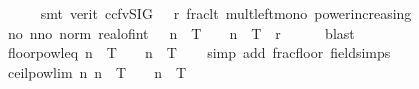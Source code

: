 \begin{isabellebody}
\ \ \ \ \isamarkupfalse%
\ {\isacharparenleft}{\kern0pt}smt\ {\isacharparenleft}{\kern0pt}verit{\isacharcomma}{\kern0pt}\ ccfv{\isacharunderscore}{\kern0pt}SIG{\isacharparenright}{\kern0pt}\ {\isacartoucheopen}{}\ {\isacharless}{\kern0pt}\ r{\isacartoucheclose}\ frac{\isacharunderscore}{\kern0pt}lt{\isacharunderscore}{\kern0pt}{}\ mult{\isacharunderscore}{\kern0pt}left{\isacharunderscore}{\kern0pt}mono\ power{\isacharunderscore}{\kern0pt}increasing{\isacharparenright}{\kern0pt}\isanewline
\ \ \isamarkupfalse%
\ \isamarkupfalse%
\ {\isachardoublequoteopen}{\isasymexists}no{\isachardot}{\kern0pt}\ {\isasymforall}n{\isasymge}no{\isachardot}{\kern0pt}\ norm\ {\isacharparenleft}{\kern0pt}real{\isacharunderscore}{\kern0pt}of{\isacharunderscore}{\kern0pt}int\ {\isasymlfloor}{}\ {\isacharcircum}{\kern0pt}\ n\ {\isacharasterisk}{\kern0pt}\ T{\isasymrfloor}\ {\isacharslash}{\kern0pt}\ {}\ {\isacharcircum}{\kern0pt}\ n\ {\isacharminus}{\kern0pt}\ T{\isacharparenright}{\kern0pt}\ {\isacharless}{\kern0pt}\ r{\isachardoublequoteclose}\isanewline
\ \ \ \ \isamarkupfalse%
\ blast\isanewline
{}\isamarkupfalse%
%
\endisatagproof
{\isafoldproof}%
%
\isadelimproof
%
\endisadelimproof
\isanewline
\isanewline
{}\isamarkupfalse%
\ floor{\isacharunderscore}{\kern0pt}pow{}{\isacharunderscore}{\kern0pt}leq{\isacharcolon}{\kern0pt}\ {\isachardoublequoteopen}{\isasymlfloor}{}{\isacharcircum}{\kern0pt}n\ {\isacharasterisk}{\kern0pt}\ T{\isasymrfloor}\ {\isacharslash}{\kern0pt}\ {}\ {\isacharcircum}{\kern0pt}\ n\ {\isasymle}\ T{\isachardoublequoteclose}\isanewline
%
\isadelimproof
\ \ %
\endisadelimproof
%
\isatagproof
{}\isamarkupfalse%
\ {\isacharparenleft}{\kern0pt}simp\ add{\isacharcolon}{\kern0pt}\ frac{\isacharunderscore}{\kern0pt}floor\ field{\isacharunderscore}{\kern0pt}simps{\isacharparenright}{\kern0pt}%
\endisatagproof
{\isafoldproof}%
%
\isadelimproof
\isanewline
%
\endisadelimproof
\ \isanewline
{}\isamarkupfalse%
\ ceil{\isacharunderscore}{\kern0pt}pow{}{\isacharunderscore}{\kern0pt}lim{\isacharcolon}{\kern0pt}\ {\isachardoublequoteopen}{\isacharparenleft}{\kern0pt}{\isasymlambda}n{\isachardot}{\kern0pt}\ {\isasymlceil}{}{\isacharcircum}{\kern0pt}n\ {\isacharasterisk}{\kern0pt}\ T{\isasymrceil}\ {\isacharslash}{\kern0pt}\ {}\ {\isacharcircum}{\kern0pt}\ n{\isacharparenright}{\kern0pt}\ {\isasymlonglonglongrightarrow}\ T{\isachardoublequoteclose}\isanewline

\end{isabellebody}
